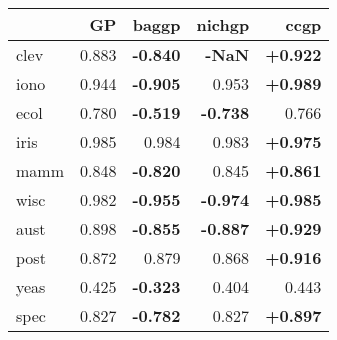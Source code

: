 \begin{tabular}{lrrrr}
\toprule
{} &     GP &  baggp &  nichgp &   ccgp \\
\midrule
clev & 0.883 &    \textbf{-0.840} &    \textbf{-NaN} & \textbf{+0.922} \\
iono & 0.944 &    \textbf{-0.905} & 0.953 & \textbf{+0.989} \\
ecol & 0.780 &    \textbf{-0.519} &    \textbf{-0.738} & 0.766 \\
iris & 0.985 & 0.984 & 0.983 & \textbf{+0.975} \\
mamm & 0.848 &    \textbf{-0.820} & 0.845 & \textbf{+0.861} \\
wisc & 0.982 &    \textbf{-0.955} &    \textbf{-0.974} & \textbf{+0.985} \\
aust & 0.898 &    \textbf{-0.855} &    \textbf{-0.887} & \textbf{+0.929} \\
post & 0.872 & 0.879 & 0.868 & \textbf{+0.916} \\
yeas & 0.425 &    \textbf{-0.323} & 0.404 & 0.443 \\
spec & 0.827 &    \textbf{-0.782} & 0.827 & \textbf{+0.897} \\
\bottomrule
\end{tabular}
